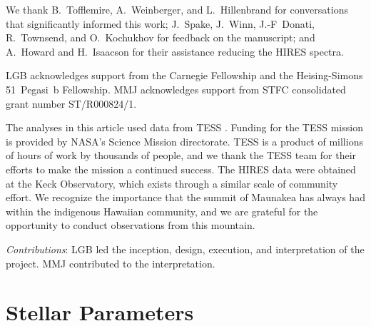 \documentclass[11pt,twocolumn,tighten]{aastex7}
\begin{document}
\begin{acknowledgements}
  We thank B.~Tofflemire, A.~Weinberger, and L.~Hillenbrand for
  conversations that significantly informed this work; J.~Spake,
  J.~Winn, J.-F~Donati, R.~Townsend, and O.~Kochukhov for feedback on the
  manuscript; and A.~Howard and H.~Isaacson for their assistance
  reducing the HIRES spectra.

  LGB acknowledges support from the Carnegie Fellowship and the
  Heising-Simons 51~Pegasi~b Fellowship.
  MMJ acknowledges support from STFC consolidated grant
  number ST/R000824/1.

  The analyses in this article used data from TESS \citep{TESS2min}.  
  Funding for the TESS mission is provided by NASA’s Science Mission
  directorate.
  TESS is a product of millions of hours of work by thousands of
  people, and we thank the TESS team for their efforts to make the
  mission a continued success.
  The HIRES data were obtained at the Keck Observatory, which exists
  through a similar scale of community effort.
  We recognize the importance that the summit of Maunakea has always
  had within the indigenous Hawaiian community, and we are grateful
  for the opportunity to conduct observations from this mountain.
\end{acknowledgements}

{\it \large Contributions}: 
LGB led the inception, design, execution, and interpretation of the
project.  MMJ contributed to the interpretation.








\appendix

\section{Stellar Parameters}
\label{sec:stparams}
\end{document}

